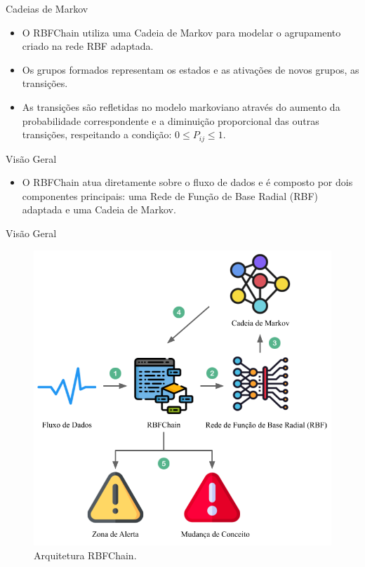\documentclass[10pt]{beamer}
\begin{document}
\begin{frame}{Cadeias de Markov}
    \begin{itemize}
        \item<1 -> O RBFChain utiliza uma Cadeia de Markov para modelar o agrupamento criado na rede RBF adaptada.
        \item<1 -> Os grupos formados representam os estados e as ativações de novos grupos, as transições.
        \item<1 -> As transições são refletidas no modelo markoviano através do aumento da probabilidade correspondente e a diminuição proporcional das outras transições, respeitando a condição: $0 \leq P_{ij} \leq 1$.
      \end{itemize}
\end{frame}

\begin{frame}{Visão Geral}
    \begin{itemize}
        \item<1 -> O RBFChain atua diretamente sobre o fluxo de dados e é composto por dois componentes principais: uma Rede de Função de Base Radial (RBF) adaptada e uma Cadeia de Markov.
      \end{itemize}
\end{frame}

\begin{frame}{Visão Geral}
        \begin{figure}[H]
            \begin{center}
                \includegraphics[scale=0.4]{imagens/arquitetura_rbfchain.png}
                \caption{Arquitetura RBFChain.}
                \label{fig:arquitetura}
            \end{center}
        \end{figure}
\end{frame}
\end{document}
